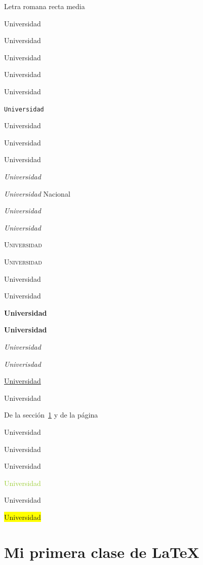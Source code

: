 \documentclass[12pt,a4paer]{article}
\begin{document}
Letra romana recta media

Universidad

\textrm{Universidad}

{
\rmfamily Universidad
}

\textsf{Universidad}

{
\sffamily Universidad
}


\texttt{Universidad}

{
\ttfamily Universidad
}


\textup{Universidad}

{
\upshape Universidad
}

\textit{Universidad}

{
\itshape Universidad\/
}Nacional%

\textsl{Universidad}

{
\slshape Universidad\/ %
}


\textsc{Universidad} %

{\scshape Universidad}

\textmd{Universidad}

{
\mdseries Universidad %
}

\textbf{Universidad}

{
\bfseries Universidad
}

\emph{Universidad}

{
\em Univerisdad
}

\underline{Universidad}


\clearpage

{
\Huge Universidad
}

De la sección~\ref{sec:1} y de la página~\pageref{sec:1}


{
\Large Universidad
}

{
\small Universidad
}

{
\tiny Universidad
}

\newpage

\textcolor{YellowGreen}{Universidad}

{
\color{Red} Universidad
}

{
\colorbox{Yellow}{Universidad}
}

\tableofcontents

\section{Mi primera clase de \LaTeX}\label{sec:1}%
\end{document}
